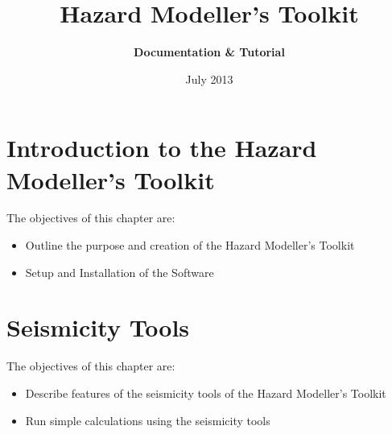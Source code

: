 \documentclass[11pt,a4paper,headings=small,dvips]{scrbook}
\newenvironment{myfancybox}{%
  \def\FrameCommand{\fboxsep=\FrameSep \fcolorbox{blue01}{honeydew}}%
  \color{black}\MakeFramed {\FrameRestore}}%
 {\endMakeFramed}
\begin{document}
\setcounter{page}{1}

\begin{titlepage}
	\title{ \textcolor{blue01}{\textsf{\bfseries\Huge 
        Hazard Modeller's Toolkit
        }}}
	\subtitle{ \textcolor{blue01}{\textsf{\bfseries\LARGE
        Documentation \& Tutorial}}}
	\date{July 2013}
 
	\publishers{GEM Foundation, Pavia}
\end{titlepage}
\pagestyle{scrheadings}
\maketitle
%
\tableofcontents
\cleardoublepage
% 
\chapter{Introduction to the Hazard Modeller's Toolkit}
\begin{myfancybox}
The objectives of this chapter are:
\begin{itemize}
    \item Outline the purpose and creation of the Hazard Modeller's Toolkit 
    \item Setup and Installation of the Software
\end{itemize}
\end{myfancybox}
  
\cleardoublepage

\chapter{Seismicity Tools}
\begin{myfancybox}
The objectives of this chapter are:
\begin{itemize}
    \item Describe features of the seismicity tools of the Hazard Modeller's Toolkit 
    \item Run simple calculations using the seismicity tools
\end{itemize}
\end{myfancybox}
  
\cleardoublepage
\end{document}
